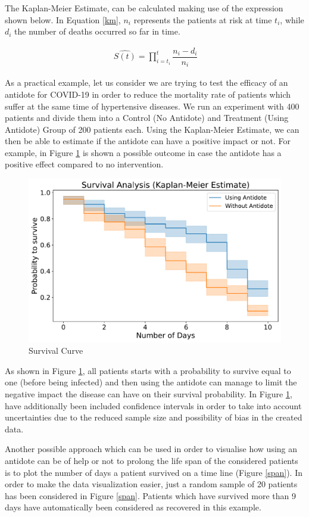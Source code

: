 The Kaplan-Meier Estimate, can be calculated making use of the expression shown below. In Equation \ref{km}, $n_{i}$ represents the patients at risk at time $t_{i}$, while $d_{i}$ the number of deaths occurred so far in time.

\useshortskip
\begin{align}
\ \widehat{S(t)} = \prod_{i=t_{i}}^{t} \dfrac{n_{i}-d_{i}}{n_{i}}
\label{km}
\end{align}
\useshortskip

As a practical example, let us consider we are trying to test the efficacy of an antidote for COVID-19 in order to reduce the mortality rate of patients which suffer at the same time of hypertensive diseases. We run an experiment with 400 patients and divide them into a Control (No Antidote) and Treatment (Using Antidote) Group of 200 patients each. Using the Kaplan-Meier Estimate, we can then be able to estimate if the antidote can have a positive impact or not. For example, in Figure \ref{s_curve} is shown a possible outcome in case the antidote has a positive effect compared to no intervention.

\begin{figure}[ht!]%
    \centering
    \includegraphics[width=0.55\linewidth]{latex/images/survival.pdf}
    \vspace{-0.2cm}
    \caption{Survival Curve}
    \label{s_curve}
\end{figure}

As shown in Figure \ref{s_curve}, all patients starts with a probability to survive equal to one (before being infected) and then using the antidote can manage to limit the negative impact the disease can have on their survival probability. In Figure \ref{s_curve}, have additionally been included confidence intervals in order to take into account uncertainties due to the reduced sample size and possibility of bias in the created data.

Another possible approach which can be used in order to visualise how using an antidote can be of help or not to prolong the life span of the considered patients is to plot the number of days a patient survived on a time line (Figure \ref{span}). In order to make the data visualization easier, just a random sample of 20 patients has been considered in Figure \ref{span}. Patients which have survived more than 9 days have automatically been considered as recovered in this example.

